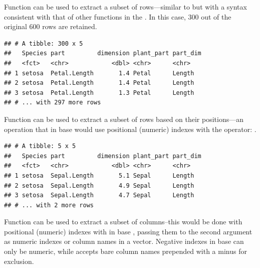 \documentclass[krantz2]{krantz}\usepackage{knitr}
\begin{document}
Function  can be used to extract a subset of rows---similar to  but with a syntax consistent with that of other functions in the . In this case, 300 out of the original 600 rows are retained.

\begin{knitrout}\footnotesize
{}\color{fgcolor}\begin{kframe}
\begin{alltt}
 \hlopt{==} \hlstd{)}
\end{alltt}
\begin{verbatim}
## # A tibble: 300 x 5
##   Species part         dimension plant_part part_dim
##   <fct>   <chr>            <dbl> <chr>      <chr>   
## 1 setosa  Petal.Length       1.4 Petal      Length  
## 2 setosa  Petal.Length       1.4 Petal      Length  
## 3 setosa  Petal.Length       1.3 Petal      Length  
## # ... with 297 more rows
\end{verbatim}
\end{kframe}
\end{knitrout}

Function  can be used to extract a subset of rows based on their positions---an operation that in base \Rlang would use positional (numeric) indexes with the \code{[ , ]} operator: .

\begin{knitrout}\footnotesize
{}\color{fgcolor}\begin{kframe}
\begin{alltt}
 \hlopt{:}\hlstd{)}
\end{alltt}
\begin{verbatim}
## # A tibble: 5 x 5
##   Species part         dimension plant_part part_dim
##   <fct>   <chr>            <dbl> <chr>      <chr>   
## 1 setosa  Sepal.Length       5.1 Sepal      Length  
## 2 setosa  Sepal.Length       4.9 Sepal      Length  
## 3 setosa  Sepal.Length       4.7 Sepal      Length  
## # ... with 2 more rows
\end{verbatim}
\end{kframe}
\end{knitrout}

Function  can be used to extract a subset of columns--this would be done with positional (numeric) indexes with \code{[ , ]} in base \Rlang, passing them to the second argument as numeric indexes or column names in a vector. Negative indexes in base \Rlang can only be numeric, while  accepts bare column names prepended with a minus for exclusion.
\end{document}
